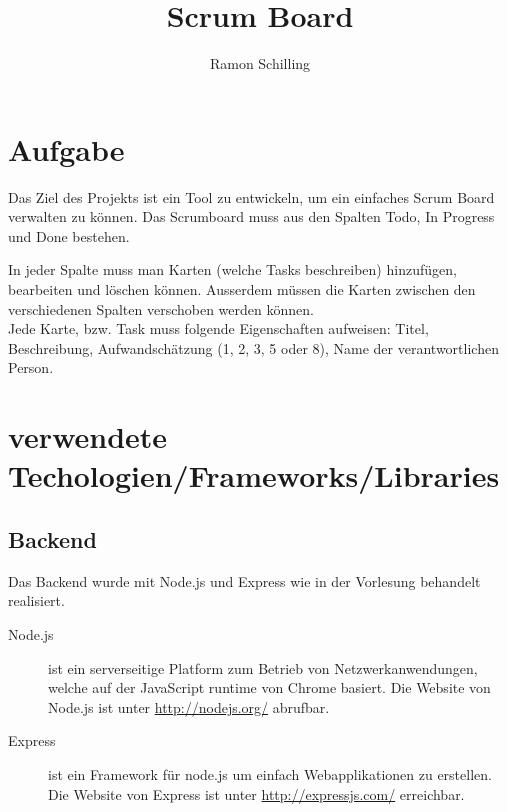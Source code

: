 \documentclass[a4paper,aps,secnumarabic,balancelastpage,nofootinbib]{revtex4}
\begin{document}
\title{Scrum Board}
\author{Ramon Schilling}
\maketitle

\section{Aufgabe}
Das Ziel des Projekts ist ein Tool zu entwickeln, um ein einfaches Scrum Board verwalten zu können.
Das Scrumboard muss aus den Spalten Todo, In Progress und Done bestehen.

In jeder Spalte muss man Karten (welche Tasks beschreiben) hinzufügen, bearbeiten und löschen können. Ausserdem müssen die Karten zwischen den verschiedenen Spalten verschoben werden können.\\

Jede Karte, bzw. Task muss folgende Eigenschaften aufweisen: Titel, Beschreibung, Aufwandschätzung (1, 2, 3, 5 oder 8), Name der verantwortlichen Person.

\section{verwendete Techologien/Frameworks/Libraries}

\subsection{Backend}
Das Backend wurde mit Node.js und Express wie in der Vorlesung behandelt realisiert.
\begin{description}
\item[Node.js] ist ein serverseitige Platform zum Betrieb von Netzwerkanwendungen, welche auf der JavaScript runtime von Chrome basiert. Die Website von Node.js ist unter \url{http://nodejs.org/} abrufbar.
\item[Express] ist ein Framework für node.js um einfach Webapplikationen zu erstellen. Die Website von Express ist unter \url{http://expressjs.com/} erreichbar.
\end{description}
\end{document}
